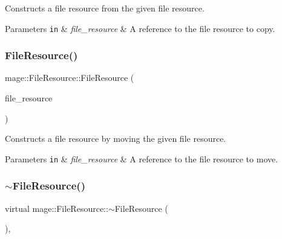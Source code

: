 Constructs a file resource from the given file resource.


\begin{DoxyParams}[1]{Parameters}
\mbox{\tt in}  & {\em file\+\_\+resource} & A reference to the file resource to copy. \\
\hline
\end{DoxyParams}
\hypertarget{classmage_1_1_file_resource_a31bf9e2b425e284e2ed65bf18cd7af7b}{}\label{classmage_1_1_file_resource_a31bf9e2b425e284e2ed65bf18cd7af7b} 
\subsubsection{\texorpdfstring{File\+Resource()}{FileResource()}\hspace{0.1cm}{\footnotesize\ttfamily [3/3]}}
{\footnotesize\ttfamily mage\+::\+File\+Resource\+::\+File\+Resource (\begin{DoxyParamCaption}\item[{\hyperlink{classmage_1_1_file_resource}{File\+Resource} \&\&}]{file\+\_\+resource }\end{DoxyParamCaption})\hspace{0.3cm}{\ttfamily [default]}}

Constructs a file resource by moving the given file resource.


\begin{DoxyParams}[1]{Parameters}
\mbox{\tt in}  & {\em file\+\_\+resource} & A reference to the file resource to move. \\
\hline
\end{DoxyParams}
\hypertarget{classmage_1_1_file_resource_a91ed639ff33311ebdfb54c80be7d6f62}{}\label{classmage_1_1_file_resource_a91ed639ff33311ebdfb54c80be7d6f62} 
\subsubsection{\texorpdfstring{$\sim$\+File\+Resource()}{~FileResource()}}
{\footnotesize\ttfamily virtual mage\+::\+File\+Resource\+::$\sim$\+File\+Resource (\begin{DoxyParamCaption}{ }\end{DoxyParamCaption})\hspace{0.3cm}{\ttfamily [virtual]}, {\ttfamily [default]}}

